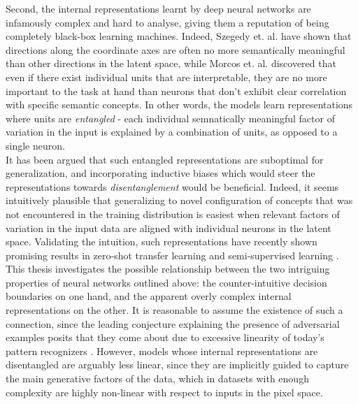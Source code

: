 \documentclass{report}
\begin{document}
\noindent Second, the internal representations learnt by deep neural networks are infamously complex and hard to analyse, giving them a reputation of being completely black-box learning machines. Indeed, Szegedy et. al. \cite{intriguing-properties} have shown that directions along the coordinate axes are often no more semantically meaningful than other directions in the latent space, while Morcos et. al. \cite{importance-single-directions} discovered that even if there exist individual units that are interpretable, they are no more important to the task at hand than neurons that don't exhibit clear correlation with specific semantic concepts. In other words, the models learn representations where units are \textit{entangled} - each individual semnatically meaningful factor of variation in the input is explained by a combination of units, as opposed to a single neuron. \\

\noindent It has been argued \cite{bengio-representation} that such entangled representations are suboptimal for generalization, and incorporating inductive biases which would steer the representations towards \textit{disentanglement} would be beneficial. Indeed, it seems intuitively plausible that generalizing to novel configuration of concepts that was not encountered in the training distribution is easiest when relevant factors of variation in the input data are aligned with individual neurons in the latent space. Validating the intuition, such representations have recently shown promising results in zero-shot transfer learning \cite{darla} and semi-supervised learning \cite{dgpose}. \\

\noindent This thesis investigates the possible relationship between the two intriguing properties of neural networks outlined above: the counter-intuitive decision boundaries on one hand, and the apparent overly complex internal representations on the other. It is reasonable to assume the existence of such a connection, since the leading conjecture explaining the presence of adversarial examples posits that they come about due to excessive linearity of today's pattern recognizers \cite{explaining-and-harnessing}. However, models whose internal representations are disentangled are arguably less linear, since they are implicitly guided to capture the main generative factors of the data, which in datasets with enough complexity are highly non-linear with respect to inputs in the pixel space. \\
\end{document}
